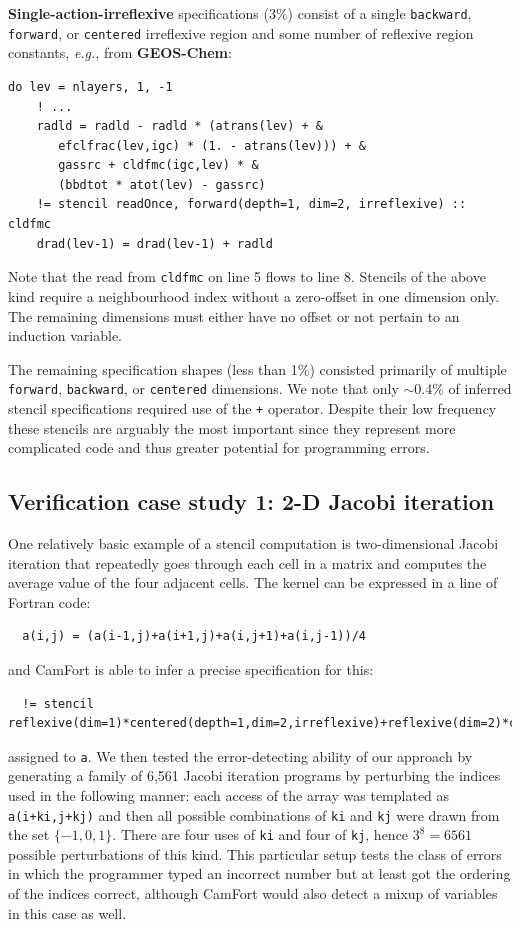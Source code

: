 \documentclass[9pt,preprint]{sigplanconf}
\theoremstyle{definition}
\newcommand{\eg}{\emph{e.g.}}
\newcommand{\term}[1]{\texttt{#1}}
\begin{document}
\textbf{Single-action-irreflexive} specifications (3\%) consist of a single
\term{backward}, \term{forward}, or \term{centered} irreflexive region 
and some number of reflexive region constants, \eg{}, from \textbf{GEOS-Chem}:
\begin{verbatim}
do lev = nlayers, 1, -1
    ! ...
    radld = radld - radld * (atrans(lev) + &
       efclfrac(lev,igc) * (1. - atrans(lev))) + &
       gassrc + cldfmc(igc,lev) * &
       (bbdtot * atot(lev) - gassrc)
    != stencil readOnce, forward(depth=1, dim=2, irreflexive) :: cldfmc
    drad(lev-1) = drad(lev-1) + radld
\end{verbatim}
Note that the read from 
\texttt{cldfmc} on line 5 flows to line 8. Stencils of
the above kind require a neighbourhood index without a zero-offset in
one dimension only. The remaining dimensions must either have no
offset or not pertain to an induction variable.

The remaining specification shapes (less than 1\%) consisted
primarily of multiple \term{forward}, \term{backward}, or
\term{centered} dimensions. We note that only $\sim$0.4\% of inferred
stencil specifications required use of the \term{+} operator. Despite their low frequency these stencils are arguably the most important since they represent more complicated code and thus greater potential for programming errors.

\subsection{Verification case study 1: 2-D Jacobi iteration}

One relatively basic example of a stencil computation is two-dimensional
Jacobi iteration that repeatedly goes through each cell in a matrix
and computes the average value of the four adjacent cells. The kernel
can be expressed in a line of Fortran code:
\begin{verbatim}
  a(i,j) = (a(i-1,j)+a(i+1,j)+a(i,j+1)+a(i,j-1))/4
\end{verbatim}
and CamFort is able to infer a precise specification for this:
\begin{verbatim}
  != stencil reflexive(dim=1)*centered(depth=1,dim=2,irreflexive)+reflexive(dim=2)*centered(depth=1,dim=1,irreflexive)
\end{verbatim}
assigned to \term{a}. 
We then tested the error-detecting ability of our approach by 
generating a family of 6,561 Jacobi iteration programs by perturbing
the indices used in the following manner: each access of the array was
templated as \texttt{a(i+ki,j+kj)} and then all possible
combinations of \texttt{ki} and \texttt{kj}
were drawn from the set $\{-1,0,1\}$. There are four uses of
\texttt{ki} and four of \texttt{kj}, hence
$3^8=6561$ possible perturbations of this kind. This particular setup
tests the class of errors in which the programmer typed an incorrect
number but at least got the ordering of the indices correct, although
CamFort would also detect a mixup of variables in this case as well.
\end{document}
